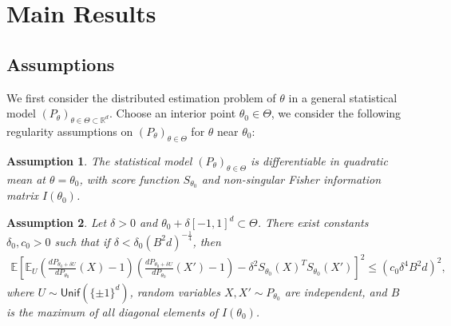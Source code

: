 \documentclass[final,12pt]{colt2018} %
\def \bE {\mathbb{E}}
\def \bR {\mathbb{R}}
\newtheorem{assumption}{Assumption}
\begin{document}
\section{Main Results}
\subsection{Assumptions}
We first consider the distributed estimation problem of $\theta$ in a general statistical model $(P_\theta)_{\theta\in\Theta\subset\bR^d}$. Choose an interior point $\theta_0\in \Theta$, we consider the following regularity assumptions on $(P_\theta)_{\theta\in\Theta}$ for $\theta$ near $\theta_0$:
\begin{assumption}\label{assump.ULAN}
	The statistical model $(P_\theta)_{\theta\in\Theta}$ is differentiable in quadratic mean at $\theta=\theta_0$, with score function $S_{\theta_0}$ and non-singular Fisher information matrix $I(\theta_0)$. 
\end{assumption}
\begin{assumption}\label{assump.var}
	Let $\delta>0$ and $\theta_0 + \delta [-1,1]^d\subset \Theta$. There exist constants $\delta_0, c_0>0$ such that if $\delta<\delta_0(B^2d)^{-\frac{1}{4}}$, then
	\begin{align}\label{eq.assumption_2}
	\bE \left[\bE_{U} \left(\frac{dP_{\theta_0+\delta U}}{dP_{\theta_0}}(X)-1\right) \left(\frac{dP_{\theta_0+\delta U}}{dP_{\theta_0}}(X') -1 \right) - \delta^2S_{\theta_0}(X)^T S_{\theta_0}(X') \right]^2 \le (c_0\delta^4B^2d)^2,
	\end{align}
	where $U\sim \mathsf{Unif}( \{\pm 1\}^d )$, random variables $X,X'\sim P_{\theta_0}$ are independent, and $B$ is the maximum of all diagonal elements of $I(\theta_0)$.
\end{assumption}
\end{document}
